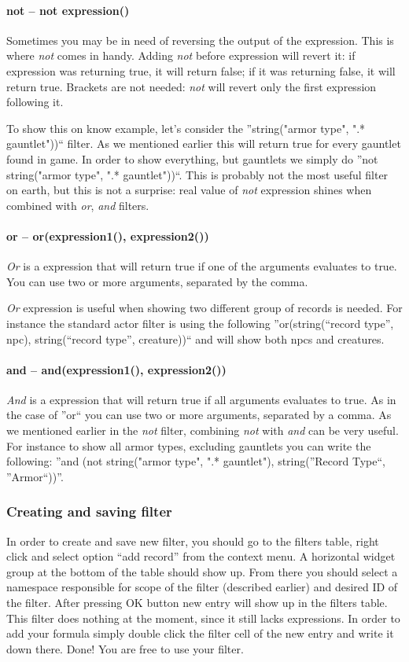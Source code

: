 \paragraph{not -- not expression()}
Sometimes you may be in need of reversing the output of the expression. This is where \textit{not} comes in handy. Adding \textit{not} before
expression will revert it: if expression was returning true, it will return false; if it was returning false, it will return true. Brackets
are not needed: \textit{not} will revert only the first expression following it.

To show this on know example, let's consider the ''string("armor type", ".* gauntlet"))`` filter. As we mentioned earlier this will return true
for every gauntlet found in game. In order to show everything, but gauntlets we simply do ''not string("armor type", ".* gauntlet"))``.
This is probably not the most useful filter on earth, but this is not a surprise: real value of \textit{not} expression shines when combined with
\textit{or}, \textit{and} filters.

\paragraph{or -- or(expression1(), expression2())}
\textit{Or} is a expression that will return true if one of the arguments evaluates to true. You can use two or more arguments, separated by the comma.

\textit{Or} expression is useful when showing two different group of records is needed. For instance the standard actor filter is using the following
''or(string(``record type'', npc), string(``record type'', creature))`` and will show both npcs and creatures.

\paragraph{and -- and(expression1(), expression2())}
\textit{And} is a expression that will return true if all arguments evaluates to true. As in the case of ''or`` you can use two or more arguments,
separated by a comma.
As we mentioned earlier in the \textit{not} filter, combining \textit{not} with \textit{and} can be very useful. For instance to show all armor types,
excluding gauntlets you can write the following: ''and (not string("armor type", ".* gauntlet"), string(''Record Type``, ''Armor``))''.

\subsubsection{Creating and saving filter}
In order to create and save new filter, you should go to the filters table, right click and select option ``add record'' from the context menu.
A horizontal widget group at the bottom of the table should show up. From there you should select a namespace responsible for scope of
the filter (described earlier) and desired ID of the filter. After pressing OK button new entry will show up in the filters table. This filter
does nothing at the moment, since it still lacks expressions. In order to add your formula simply double click the filter cell of the new entry
and write it down there.
Done! You are free to use your filter.

